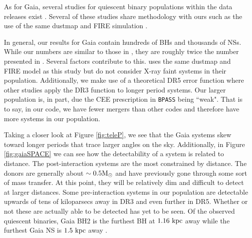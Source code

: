 \documentclass{pas}
\begin{document}
As for Gaia, several studies for quiescent binary populations within the data releases exist \citep{RevealingBHwGaia, 2019ApJ...886...68A, 2025PASP..137d4202N, 2025arXiv250821805C}. Several of these studies share methodology with ours such as the use of the same dustmap and \textsc{FIRE} simulation \citep{2025arXiv250821805C}.

In general, our results for Gaia contain hundreds of BHs and thousands of NSs. While our numbers are similar to those in \citet{RevealingBHwGaia}, they are roughly twice the number presented in \citet{2025arXiv250821805C}. Several factors contribute to this. \citet{2025arXiv250821805C} uses the same dustmap and \textsc{FIRE} model as this study but do not consider X-ray faint systems in their population. Additionally, we make use of a theoretical DR5 error function where other studies apply the DR3 function to longer period systems. Our larger population is, in part, due the CEE prescription in \texttt{BPASS} being ``weak". That is to say, in our code, we have fewer mergers than other codes and therefore have more systems in our population. 

Taking a closer look at Figure \ref{fig:teleP}, we see that the Gaia systems skew toward longer periods that trace larger angles on the sky. Additionally, in Figure \ref{fig:gaiaSPACE} we can see how the detectability of a system is related to distance. The post-interaction systems are the most constrained by distance. The donors are generally about $\sim0.5\rm{M_{\odot}}$ and have previously gone through some sort of mass transfer. At this point, they will be relatively dim and difficult to detect at larger distances. Some pre-interaction systems in our population are detectable upwards of tens of kiloparsecs away in DR3 and even further in DR5. Whether or not these are actually able to be detected has yet to be seen. Of the observed quiescent binaries, Gaia BH2 is the furthest BH at $\rm{1.16~kpc}$ away \citep{El_Badry2023} while the furthest Gaia NS is $\rm{1.5~kpc}$ away \citep{elbadry2024populationneutronstarcandidates}. 
\end{document}
